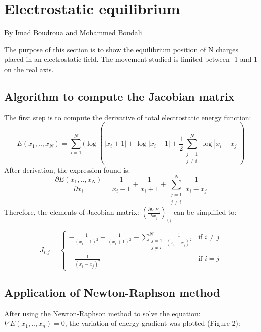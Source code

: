\documentclass{article}
\begin{document}
\newpage
\section{Electrostatic equilibrium}
\begin{flushright}
By Imad Boudroua and  Mohammed Boudali
\end{flushright}

The purpose of this section is to show the equilibrium position of N charges placed in an electrostatic field. The movement studied is limited between -1 and 1 on the real axis.
\subsection{Algorithm to compute the Jacobian matrix}
The first step is to  compute the derivative of total  electrostatic energy function:
\begin{equation}
    E(x_1,..,x_N) = \sum_{i=1}^{N} ( \log(|x_i + 1| + \log|x_i - 1| + \frac{1}{2}\sum_{\substack{j=1 \\ j\neq i}}^{N} \log|x_i - x_j| )
\end{equation}
    After derivation, the expression found is:
\begin{equation}
\frac{\partial  E(x_1, ..,x_N)}{\partial x_i}
   = \frac{1}{x_i - 1}
      + \frac{1}{x_i + 1}
      + \sum_{\substack{j=1 \\ j\neq i}}^{N}\frac{1}{x_i - x_j}
      \end{equation}
Therefore, the elements of Jacobian matrix: $(\frac{\partial \nabla E_i}{\partial x_j})_{_{i,j}}$ can be simplified to: 

\vspace{5pt}

\[J_{i,j} = \begin{cases} -\frac{1}{(x_i - 1)^2} -\frac{1}{(x_i + 1)^2} - \sum_{\substack{j=1 \\ j\neq i}}^{N}\frac{1}{(x_i - x_j)^2} &\mbox{if } i\neq j \\
-\frac{1}{(x_i - x_j)^2} & \mbox{if }  i = j \end{cases}
\]


\subsection{Application of Newton-Raphson method}
    After using the Newton-Raphson method to solve the equation: $\nabla E(x_1, ..,x_n) = 0$,  the variation of energy gradient was plotted (Figure 2):
    
\end{document}

